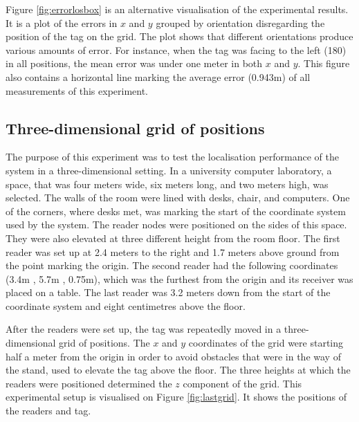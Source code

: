 Figure \ref{fig:errorlosbox} is an alternative visualisation of the experimental results. It is a plot of the errors in $x$ and $y$ grouped by orientation disregarding the position of the tag on the grid. The plot shows that different orientations produce various amounts of error. For instance, when the tag was facing to the left (180\textdegree) in all positions, the mean error was under one meter in both $x$ and $y$. This figure also contains a horizontal line marking the average error (0.943m) of all measurements of this experiment.


\subsection{Three-dimensional grid of positions}

The purpose of this experiment was to test the localisation performance of the system in a three-dimensional setting. In a university computer laboratory, a space, that was four meters wide, six meters long, and two meters high, was selected. The walls of the room were lined with desks, chair, and computers. One of the corners, where desks met, was marking the start of the coordinate system used by the system. The reader nodes were positioned on the sides of this space. They were also elevated at three different height from the room floor. The first reader was set up at 2.4 meters to the right and 1.7 meters above ground from the point marking the origin. The second reader had the following coordinates (3.4m , 5.7m , 0.75m), which was the furthest from the origin and its receiver was placed on a table. The last reader was 3.2 meters down from the start of the coordinate system and eight centimetres above the floor.

After the readers were set up, the tag was repeatedly moved in a three-dimensional grid of positions. The $x$ and $y$ coordinates of the grid were starting half a meter from the origin in order to avoid obstacles that were in the way of the stand, used to elevate the tag above the floor. The three heights at which the readers were positioned determined the $z$ component of the grid. This experimental setup is visualised on Figure \ref{fig:lastgrid}. It shows the positions of the readers and tag.

